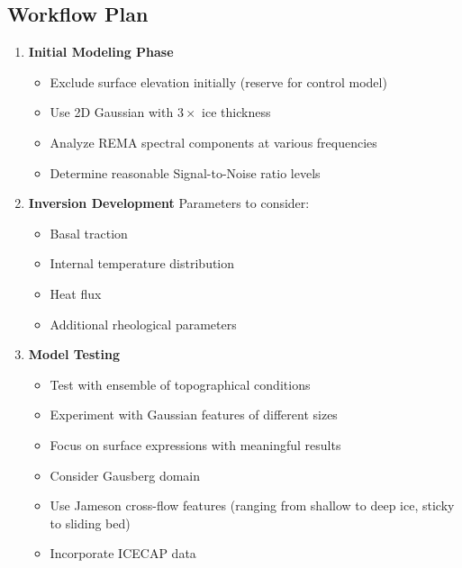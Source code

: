 \subsection*{Workflow Plan}

\begin{enumerate}
\item\textbf{Initial Modeling Phase}
    \begin{itemize}
    \item Exclude surface elevation initially (reserve for control model)
    \item Use 2D Gaussian with $3\times$ ice thickness
    \item Analyze REMA spectral components at various frequencies
    \item Determine reasonable Signal-to-Noise ratio levels
    \end{itemize}

\item\textbf{Inversion Development}
    Parameters to consider:
    \begin{itemize}
        \item Basal traction
        \item Internal temperature distribution
        \item Heat flux
        \item Additional rheological parameters
    \end{itemize}

\item\textbf{Model Testing}
    \begin{itemize}
    \item Test with ensemble of topographical conditions
    \item Experiment with Gaussian features of different sizes
    \item Focus on surface expressions with meaningful results
    \item Consider Gausberg domain
    \item Use Jameson cross-flow features (ranging from shallow to deep ice, sticky to sliding bed)
    \item Incorporate ICECAP data
    \end{itemize}
\end{enumerate}
